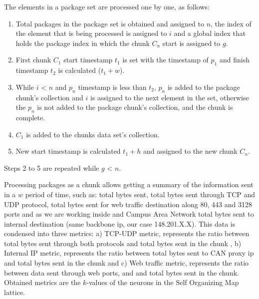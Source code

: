 \documentclass{article}
\begin{document}
The elements in a package set are processed one by one, as follows:

\begin{enumerate}
  \item Total packages in the package set is obtained and assigned to $n$, the index of the element that is being processed is assigned to $i$ and a global index that holds the package index in which the chunk $C_n$ start is assigned to $g$.
  \item First chunk $C_1$ start timestamp $t_1$ is set with the timestamp of $p_1$ and finish timestamp $t_2$ is calculated ($t_1 + w$).
  \item While $i$ < $n$ and $p_n$ timestamp is less than $t_2$, $p_n$ is added to the package chunk's collection and $i$ is assigned to the next element in the set, otherwise the $p_n$ is not added to the package chunk's collection, and the chunk is complete.
  \item $C_1$ is added to the chunks data set's collection.
  \item New start timestamp is calculated $t_1 + h$ and assigned to the new chunk $C_n$.
\end{enumerate}
Steps 2 to 5 are repeated while $g$ < $n$.

Processing packages as a chunk allows getting a summary of the information sent in a $w$ period of time, such as: total bytes sent, total bytes sent through TCP and UDP protocol, total bytes sent for web traffic destination along 80, 443 and 3128 ports and as we are working inside and Campus Area Network total bytes sent to internal destination (same backbone ip, our case 148.201.X.X). This data is condensed into three metrics: a) TCP-UDP metric, represents the ratio between total bytes sent through both protocols and total bytes sent in the chunk , b) Internal IP metric, represents the ratio between total bytes sent to CAN proxy ip and total bytes sent in the chunk and c) Web traffic metric, represents the ratio between data sent through web ports, and and total bytes sent in the chunk.
Obtained metrics are the $k$-values of the neurons in the Self Organizing Map lattice.
\end{document}
